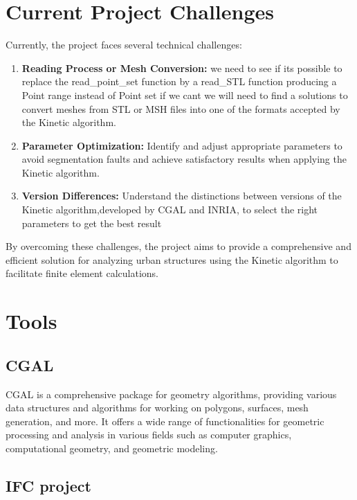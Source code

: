\documentclass{article}
\begin{document}
\section{Current Project Challenges}

Currently, the project faces several technical challenges:

\begin{enumerate}
    \item \textbf{Reading Process or Mesh Conversion:} we need to see if its possible to replace the read\_point\_set function by a read\_STL
    function producing a Point range instead of Point set if we cant we will need to find a
    solutions to convert meshes from STL or MSH files into one of the formats accepted by the Kinetic algorithm.
    
    \item \textbf{Parameter Optimization:} Identify and adjust appropriate 
    parameters to avoid segmentation faults and achieve satisfactory results 
    when applying the Kinetic algorithm.
    
    \item \textbf{Version Differences:} Understand the distinctions between 
    versions of the Kinetic algorithm,developed by CGAL and INRIA, to select 
    the right parameters to get the best result
\end{enumerate}

By overcoming these challenges, the project aims to provide a 
comprehensive and efficient solution for analyzing urban structures 
using the Kinetic algorithm to facilitate finite element calculations.\newline

\section{Tools}
\subsection{CGAL}
CGAL is a comprehensive package for geometry algorithms, providing various data structures and algorithms for working on polygons, surfaces, mesh generation, and more.
It offers a wide range of functionalities for geometric processing and analysis in various fields such as computer graphics, computational geometry, and geometric modeling.
\subsection{IFC project}
\end{document}
